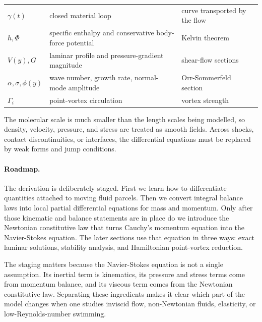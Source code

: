 \begin{table}[htbp]
\begin{tabular}{p{}p{}p{}}
\(\gamma(t)\) & closed material loop & curve transported by the flow\\
\(h,\Phi\) & specific enthalpy and conservative body-force potential & Kelvin theorem\\
\(V(y),G\) & laminar profile and pressure-gradient magnitude & shear-flow sections\\
\(\alpha,\sigma,\phi(y)\) & wave number, growth rate, normal-mode amplitude & Orr-Sommerfeld section\\
\(\Gamma_i\) & point-vortex circulation & vortex strength\\
\bottomrule
\end{tabular}
\end{table}

\begin{assumption}
The molecular scale is much smaller than the length scales being modelled, so
density, velocity, pressure, and stress are treated as smooth fields. Across
shocks, contact discontinuities, or interfaces, the differential equations must
be replaced by weak forms and jump conditions.
\end{assumption}

\paragraph{Roadmap.}
The derivation is deliberately staged. First we learn how to differentiate
quantities attached to moving fluid parcels. Then we convert integral balance
laws into local partial differential equations for mass and momentum. Only
after those kinematic and balance statements are in place do we introduce the
Newtonian constitutive law that turns Cauchy's momentum equation into the
Navier-Stokes equation. The later sections use that equation in three ways:
exact laminar solutions, stability analysis, and Hamiltonian point-vortex
reduction.

The staging matters because the Navier-Stokes equation is not a single
assumption. Its inertial term is kinematics, its pressure and stress terms come
from momentum balance, and its viscous term comes from the Newtonian
constitutive law. Separating these ingredients makes it clear which part of the
model changes when one studies inviscid flow, non-Newtonian fluids, elasticity,
or low-Reynolds-number swimming.

